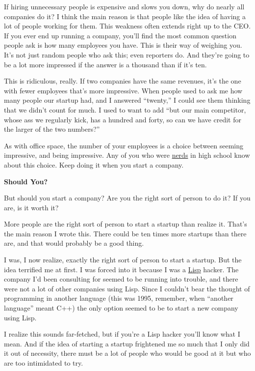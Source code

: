 \documentclass[12pt]{book}
\begin{document}
If hiring unnecessary people is expensive and slows you down, why do
nearly all companies do it? I think the main reason is that people like
the idea of having a lot of people working for them. This weakness often
extends right up to the CEO. If you ever end up running a company,
you'll find the most common question people ask is how many employees
you have. This is their way of weighing you. It's not just random people
who ask this; even reporters do. And they're going to be a lot more
impressed if the answer is a thousand than if it's ten.

This is ridiculous, really. If two companies have the same revenues,
it's the one with fewer employees that's more impressive. When people
used to ask me how many people our startup had, and I answered
``twenty,'' I could see them thinking that we didn't count for much. I
used to want to add ``but our main competitor, whose ass we regularly
kick, has a hundred and forty, so can we have credit for the larger of
the two numbers?''

As with office space, the number of your employees is a choice between
seeming impressive, and being impressive. Any of you who were
\href{nerds.html}{nerds} in high school know about this choice. Keep
doing it when you start a company.

\textbf{Should You?}

But should you start a company? Are you the right sort of person to do
it? If you are, is it worth it?

More people are the right sort of person to start a startup than realize
it. That's the main reason I wrote this. There could be ten times more
startups than there are, and that would probably be a good thing.

I was, I now realize, exactly the right sort of person to start a
startup. But the idea terrified me at first. I was forced into it
because I was a \href{icad.html}{Lisp} hacker. The company I'd been
consulting for seemed to be running into trouble, and there were not a
lot of other companies using Lisp. Since I couldn't bear the thought of
programming in another language (this was 1995, remember, when ``another
language'' meant C++) the only option seemed to be to start a new
company using Lisp.

I realize this sounds far-fetched, but if you're a Lisp hacker you'll
know what I mean. And if the idea of starting a startup frightened me so
much that I only did it out of necessity, there must be a lot of people
who would be good at it but who are too intimidated to try.
\end{document}
